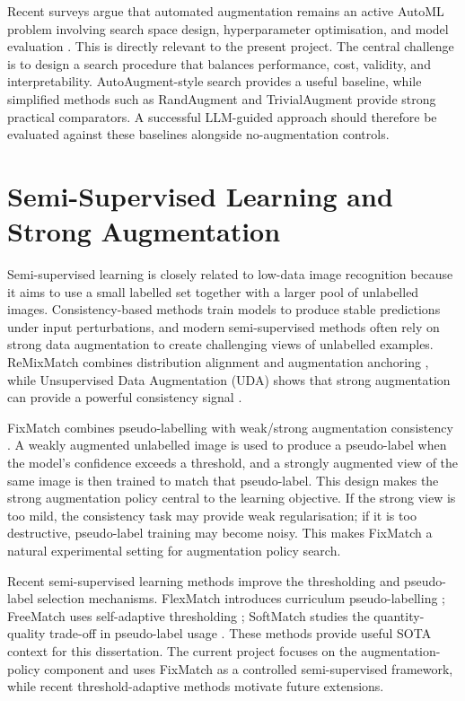 \documentclass[12pt,a4paper]{report}
\begin{document}
Recent surveys argue that automated augmentation remains an active AutoML problem involving search space design, hyperparameter optimisation, and model evaluation \citep{mumuni2024automlaugment}. This is directly relevant to the present project. The central challenge is to design a search procedure that balances performance, cost, validity, and interpretability. AutoAugment-style search provides a useful baseline, while simplified methods such as RandAugment and TrivialAugment provide strong practical comparators. A successful LLM-guided approach should therefore be evaluated against these baselines alongside no-augmentation controls.

\section{Semi-Supervised Learning and Strong Augmentation}

Semi-supervised learning is closely related to low-data image recognition because it aims to use a small labelled set together with a larger pool of unlabelled images. Consistency-based methods train models to produce stable predictions under input perturbations, and modern semi-supervised methods often rely on strong data augmentation to create challenging views of unlabelled examples. ReMixMatch combines distribution alignment and augmentation anchoring \citep{berthelot2020remixmatch}, while Unsupervised Data Augmentation (UDA) shows that strong augmentation can provide a powerful consistency signal \citep{xie2020uda}.

FixMatch combines pseudo-labelling with weak/strong augmentation consistency \citep{sohn2020fixmatch}. A weakly augmented unlabelled image is used to produce a pseudo-label when the model's confidence exceeds a threshold, and a strongly augmented view of the same image is then trained to match that pseudo-label. This design makes the strong augmentation policy central to the learning objective. If the strong view is too mild, the consistency task may provide weak regularisation; if it is too destructive, pseudo-label training may become noisy. This makes FixMatch a natural experimental setting for augmentation policy search.

Recent semi-supervised learning methods improve the thresholding and pseudo-label selection mechanisms. FlexMatch introduces curriculum pseudo-labelling \citep{zhang2021flexmatch}; FreeMatch uses self-adaptive thresholding \citep{wang2023freematch}; SoftMatch studies the quantity-quality trade-off in pseudo-label usage \citep{chen2023softmatch}. These methods provide useful SOTA context for this dissertation. The current project focuses on the augmentation-policy component and uses FixMatch as a controlled semi-supervised framework, while recent threshold-adaptive methods motivate future extensions.
\end{document}
